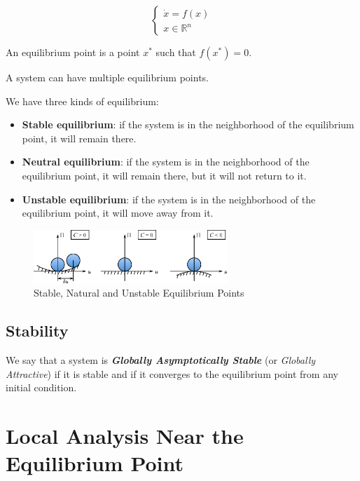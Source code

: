 $$
\begin{cases}
    \dot x = f(x) \\
    x \in \mathbb{R}^n
\end{cases}
$$

An equilibrium point is a point $x^*$ such that $f(x^*) = 0$.

\begin{tipsblock}[Eq. points]
A system can have multiple equilibrium points.
\end{tipsblock}

We have three kinds of equilibrium:

\begin{itemize}
    \item \textbf{Stable equilibrium}: if the system is in the neighborhood of the equilibrium point, it will remain there.
    \item \textbf{Neutral equilibrium}: if the system is in the neighborhood of the equilibrium point, it will remain there, but it will not return to it.
    \item \textbf{Unstable equilibrium}: if the system is in the neighborhood of the equilibrium point, it will move away from it.
\end{itemize}

\begin{figure}[H]
    \centering
    \includegraphics[width=0.65\textwidth]{assets/eq_points.png}
    \caption{Stable, Natural and Unstable Equilibrium Points \cite{stability}}
\end{figure}

\subsection{Stability}

We say that a system is \textbf{\textit{Globally Asymptotically Stable}} (or \textit{Globally Attractive}) if it is stable and if it converges to the equilibrium point from any initial condition.

\newpage
\section{Local Analysis Near the Equilibrium Point}

